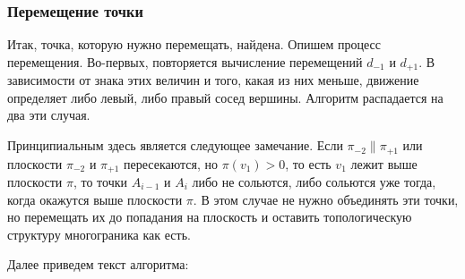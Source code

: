 \documentclass[a4paper,12pt, titlepage]{article}
\begin{document}
\subsubsection{Перемещение точки}
\begin{flushleft}
 Итак, точка, которую нужно перемещать, найдена. Опишем процесс перемещения. Во-первых, повторяется 
вычисление перемещений $d_{-1}$ и $d_{+1}$. В зависимости от знака этих величин и того, какая из них 
меньше, движение определяет либо левый, либо правый сосед вершины. Алгоритм распадается на два эти случая.
\end{flushleft}
\begin{flushleft}
  Принципиальным здесь является следующее замечание. Если $\pi_{-2} \parallel \pi_{+1}$ или плоскости
$\pi_{-2}$ и $\pi_{+1}$ пересекаются, но $\pi(v_{1}) > 0$, то есть $v_{1}$ лежит выше плоскости $\pi$, 
то точки $A_{i - 1}$ и $A_{i}$ либо не сольются, либо сольются уже тогда, когда окажутся выше плоскости 
$\pi$. В этом случае не нужно объединять эти точки, но перемещать их до попадания на плоскость и оставить
топологическую структуру многограника как есть.
\end{flushleft}
\begin{flushleft}
  Далее приведем текст алгоритма:
\end{flushleft}
\end{document}
